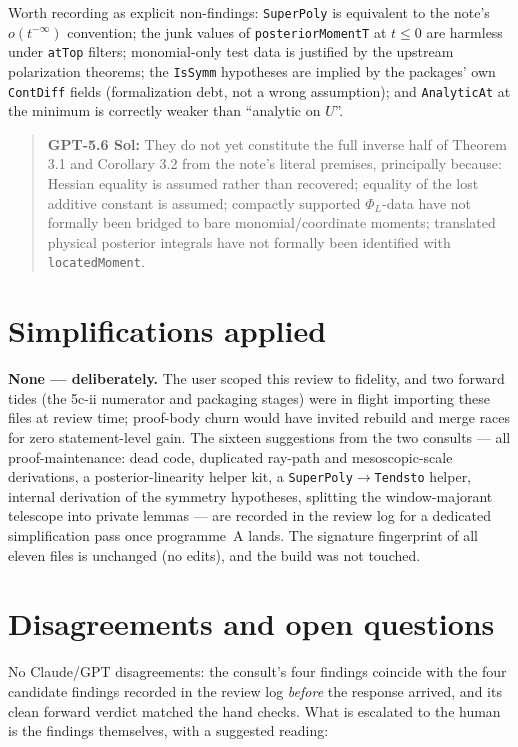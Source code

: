\documentclass[11pt]{article}
\newcommand{\gptbox}[1]{\par\medskip\begin{quote}\small\textbf{\textcolor{green!50!black}{GPT-5.6 Sol:}} #1\end{quote}\medskip}
\begin{document}
Worth recording as explicit non-findings: \texttt{SuperPoly} is equivalent to
the note's $o(t^{-\infty})$ convention; the junk values of
\texttt{posteriorMomentT} at $t\le0$ are harmless under \texttt{atTop}
filters; monomial-only test data is justified by the upstream polarization
theorems; the \texttt{IsSymm} hypotheses are implied by the packages' own
\texttt{ContDiff} fields (formalization debt, not a wrong assumption); and
\texttt{AnalyticAt} at the minimum is correctly weaker than ``analytic on
$U$''.

\gptbox{They do not yet constitute the full inverse half of Theorem 3.1 and
Corollary 3.2 from the note's literal premises, principally because: Hessian
equality is assumed rather than recovered; equality of the lost additive
constant is assumed; compactly supported $\Phi_L$-data have not formally been
bridged to bare monomial/coordinate moments; translated physical posterior
integrals have not formally been identified with \texttt{locatedMoment}.}

\section{Simplifications applied}

\textbf{None --- deliberately.} The user scoped this review to fidelity, and
two forward tides (the 5c-ii numerator and packaging stages) were in flight
importing these files at review time; proof-body churn would have invited
rebuild and merge races for zero statement-level gain. The sixteen
suggestions from the two consults --- all proof-maintenance: dead code,
duplicated ray-path and mesoscopic-scale derivations, a posterior-linearity
helper kit, a \texttt{SuperPoly}$\to$\texttt{Tendsto} helper, internal
derivation of the symmetry hypotheses, splitting the window-majorant
telescope into private lemmas --- are recorded in the review log for a
dedicated simplification pass once programme~A lands. The signature
fingerprint of all eleven files is unchanged (no edits), and the build was
not touched.

\section{Disagreements and open questions}

No Claude/GPT disagreements: the consult's four findings coincide with the
four candidate findings recorded in the review log \emph{before} the response
arrived, and its clean forward verdict matched the hand checks. What is
escalated to the human is the findings themselves, with a suggested reading:
\end{document}

